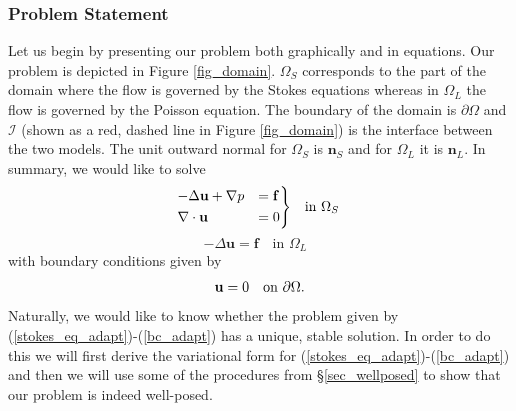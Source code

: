 \documentclass[12pt,a4paper]{article}
\theoremstyle{definition}
\begin{document}
\subsubsection{Problem Statement}
Let us begin by presenting our problem both graphically and in equations.  Our problem is depicted in Figure \ref{fig_domain}.  $\Omega_S$ corresponds to the part of the domain where the flow is governed by the Stokes equations whereas in $\Omega_L$ the flow is governed by the Poisson equation.  The boundary of the domain is $\partial\Omega$ and $\mathcal{I}$ (shown as a red, dashed line in Figure \ref{fig_domain}) is the interface between the two models.  The unit outward normal for $\Omega_S$ is $\textbf{n}_S$ and for $\Omega_L$ it is $\textbf{n}_L$.  In summary, we would like to solve
\begin{equation}
	\begin{aligned}\label{stokes_eq_adapt}
\begin{rcases}
-\Delta\textbf{u} + \nabla p &= \textbf{f} \\ 
\nabla\cdot \textbf{u}&= 0
\end{rcases}
	\end{aligned}
	\quad \text{in $\Omega_{S}$ }  
\end{equation}
\begin{equation}\label{poisson_eq_adapt}
-\Delta\textbf{u}= \textbf{f}\quad \text{in $\Omega_{L}$ }
\end{equation}
with boundary conditions given by
\begin{equation}\label{bc_adapt}
	\textbf{u}= 0 \text{\quad on $\partial \Omega$}.
\end{equation}
Naturally, we would like to know whether the problem given by (\ref{stokes_eq_adapt})-(\ref{bc_adapt}) has a unique, stable solution.  In order to do this we will first derive the variational form for (\ref{stokes_eq_adapt})-(\ref{bc_adapt}) and then we will use some of the procedures from \S \ref{sec_wellposed} to show that our problem is indeed well-posed.
\end{document}

